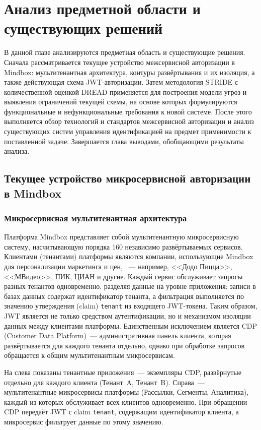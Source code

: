 \chapter{Анализ предметной области и существующих решений}\label{ch:1}

В данной главе анализируются предметная область и существующие решения.
Сначала рассматривается текущее устройство межсервисной авторизации в Mindbox:
мультитенантная архитектура, контуры развёртывания и их изоляция,
а также действующая схема JWT-авторизации.
Затем методология STRIDE с количественной оценкой DREAD применяется
для построения модели угроз и выявления ограничений текущей схемы,
на основе которых формулируются функциональные и нефункциональные
требования к новой системе.
После этого выполняется обзор технологий и стандартов
межсервисной авторизации и анализ существующих систем
управления идентификацией на предмет применимости к поставленной задаче.
Завершается глава выводами, обобщающими результаты анализа.

\section{Текущее устройство микросервисной авторизации в Mindbox}\label{sec:current-auth}

\subsection{Микросервисная мультитенантная архитектура}\label{subsec:arch}

Платформа Mindbox представляет собой мультитенантную микросервисную систему,
насчитывающую порядка 160 независимо развёртываемых сервисов.
Клиентами (тенантами) платформы являются компании, использующие Mindbox
для персонализации маркетинга и цен, ~--- например, <<Додо Пицца>>, <<МВидео>>, ПИК, ЦИАН и другие.
Каждый сервис обслуживает запросы разных тенантов одновременно,
разделяя данные на уровне приложения:
записи в базах данных содержат идентификатор тенанта,
а фильтрация выполняется по значению утверждения (claim) \texttt{tenant}
из входящего JWT-токена.
Таким образом, JWT является не только средством аутентификации,
но и механизмом изоляции данных между клиентами платформы.
Единственным исключением является CDP (Customer Data Platform)~---
административная панель клиента, которая развёртывается для каждого тенанта отдельно,
однако при обработке запросов обращается к общим мультитенантным микросервисам.

На  слева показаны тенантные приложения~---
экземпляры CDP, развёрнутые отдельно для каждого клиента (Тенант~A, Тенант~B).
Справа~--- мультитенантные микросервисы платформы
(Рассылки, Сегменты, Аналитика),
каждый из которых обслуживает всех клиентов одновременно.
При обращении CDP передаёт JWT с claim \texttt{tenant},
содержащим идентификатор клиента,
а микросервис фильтрует данные по этому значению.

